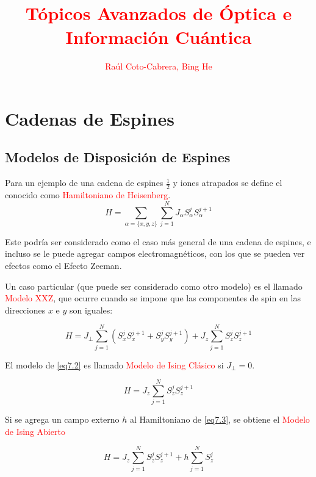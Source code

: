 \documentclass{book}
\begin{document}
\author{\textcolor{red}{Raúl Coto-Cabrera, Bing He}}
\title{\textcolor{red}{Tópicos Avanzados de Óptica e Información Cuántica}}
\vspace{0.05in}
\everymath{\color{blue}}
\everydisplay{\color{blue}}
\maketitle
\tableofcontents
\chapter{Cadenas de Espines}
\section{Modelos de Disposición de Espines}

Para un ejemplo de una cadena de espines $\frac{1}{2}$ y iones atrapados se define el conocido como \textcolor{red}{Hamiltoniano de Heisenberg}.
\begin{equation}\label{eq7.1} H=\sum_{\alpha=\{x,y,z\}}\sum_{j=1}^N J_\alpha S_\alpha^jS_\alpha^{j+1}\end{equation}

Este podría ser considerado como el caso más general de una cadena de espines, e incluso se le puede agregar campos electromagnéticos, con los que se pueden ver efectos como el Efecto Zeeman.

Un caso particular (que puede ser considerado como otro modelo) es el llamado \textcolor{red}{Modelo XXZ}, que ocurre cuando se impone que las componentes de spin en las direcciones $x$ e $y$ son iguales:

\begin{equation}\label{eq7.2}H=J_\perp \sum_{j=1}^N(S_x^jS_x^{j+1}+S_y^jS_y^{j+1})+J_z\sum_{j=1}^N S_z^jS_z^{j+1}\end{equation}

El modelo de \ref{eq7.2} es llamado \textcolor{red}{Modelo de Ising Clásico} si $J_\perp=0$.  
    
\begin{equation}\label{eq7.3}H=J_z\sum_{j=1}^N S_z^jS_z^{j+1}\end{equation}

Si se agrega un campo externo $h$ al Hamiltoniano de \ref{eq7.3}, se obtiene el \textcolor{red}{Modelo de Ising Abierto}

\begin{equation}\label{eq7.4}H=J_z\sum_{j=1}^N S_z^jS_z^{j+1}+h\sum_{j=1}^N S^j_z\end{equation}
\end{document}
